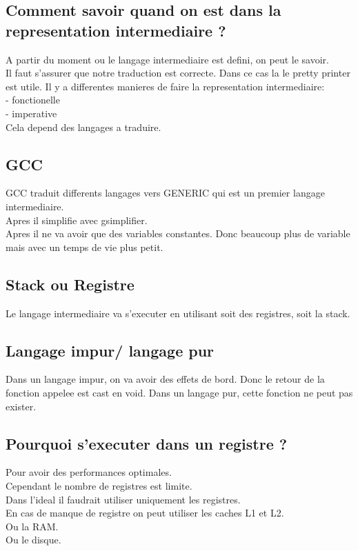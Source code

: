 \documentclass[a4paper,11pt]{article}
\begin{document}
\subsection{Comment savoir quand on est dans la representation intermediaire ?}
A  partir du moment ou le langage intermediaire est defini, on peut le savoir.\\
Il faut s'assurer que notre traduction est correcte. Dans ce cas la le pretty printer est utile.
Il y  a differentes manieres de faire la representation intermediaire:\\
- fonctionelle\\
- imperative\\

Cela depend des langages a traduire.

\subsection{GCC}\hfill \break
GCC traduit differents langages vers GENERIC qui est un premier langage intermediaire.\\
Apres il simplifie avec gsimplifier.\\
Apres il ne va avoir que des variables constantes. Donc beaucoup plus de variable mais avec un temps de vie plus petit.\\

\subsection{Stack ou Registre}
Le langage intermediaire va s'executer en utilisant soit des registres, soit la stack.

\subsection{Langage impur/ langage pur}
Dans un langage impur, on va avoir des effets de bord. Donc le retour de la fonction appelee est cast en void.
Dans un langage pur, cette fonction ne peut pas exister.

\subsection{Pourquoi s'executer dans un registre ?}

Pour avoir des performances optimales.\\
Cependant le nombre de registres est limite.\\
Dans l'ideal il faudrait utiliser uniquement les registres.\\
En cas de manque de registre on peut utiliser les caches L1 et L2.\\
Ou la RAM.\\
Ou le disque.\\
\end{document}
